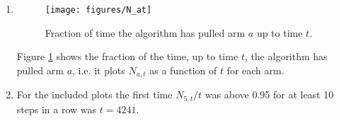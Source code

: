 \documentclass{article}
\begin{document}
\begin{enumerate}
	\item 
	\begin{figure}
		\centering
		\texttt{[image: figures/N\_at]}
		\caption{Fraction of time the algorithm has pulled arm $a$ up to time $t$.} 
		\label{fig:N_at}
	\end{figure}
	Figure \ref{fig:N_at} shows the fraction of the time, up to time $t$, the algorithm has pulled arm $a$, i.e. it plots $N_{a,t}$ as a function of $t$ for each arm.

	\item For the included plots the first time $N_{5,t}/t$ was above 0.95 for at least 10 steps in a row was $t=4241$.
\end{enumerate}
\end{document}
